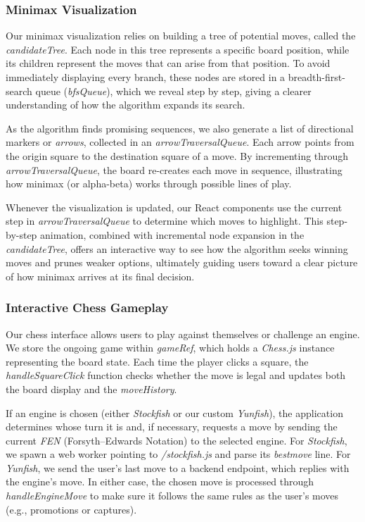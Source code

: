\documentclass[12pt,a4paper]{article}
\begin{document}
\subsubsection{Minimax Visualization}

Our minimax visualization relies on building a tree of potential moves, 
called the \emph{candidateTree}. Each node in this tree represents a 
specific board position, while its children represent the moves that 
can arise from that position. To avoid immediately displaying every 
branch, these nodes are stored in a breadth-first-search queue (\emph{bfsQueue}), 
which we reveal step by step, giving a clearer understanding of how the 
algorithm expands its search.

As the algorithm finds promising sequences, we also generate a list of 
directional markers or \emph{arrows}, collected in an \emph{arrowTraversalQueue}. 
Each arrow points from the origin square to the destination square of a 
move. By incrementing through \emph{arrowTraversalQueue}, the board 
re-creates each move in sequence, illustrating how minimax (or alpha-beta) 
works through possible lines of play. 

Whenever the visualization is updated, our React components use the 
current step in \emph{arrowTraversalQueue} to determine which moves to 
highlight. This step-by-step animation, combined with incremental node 
expansion in the \emph{candidateTree}, offers an interactive way to see 
how the algorithm seeks winning moves and prunes weaker options, 
ultimately guiding users toward a clear picture of how minimax arrives 
at its final decision.
\subsubsection{Interactive Chess Gameplay}

Our chess interface allows users to play against themselves or challenge 
an engine. We store the ongoing game within \emph{gameRef}, which holds a 
\emph{Chess.js} instance representing the board state. Each time the 
player clicks a square, the \emph{handleSquareClick} function checks 
whether the move is legal and updates both the board display and the 
\emph{moveHistory}. 

If an engine is chosen (either \emph{Stockfish} or our custom 
\emph{Yunfish}), the application determines whose turn it is and, if 
necessary, requests a move by sending the current \emph{FEN} (Forsyth–Edwards 
Notation) to the selected engine. For \emph{Stockfish}, we spawn a web 
worker pointing to \emph{/stockfish.js} and parse its \emph{bestmove} line. 
For \emph{Yunfish}, we send the user’s last move to a backend endpoint, 
which replies with the engine’s move. In either case, the chosen move is 
processed through \emph{handleEngineMove} to make sure it follows the 
same rules as the user’s moves (e.g., promotions or captures). 
\end{document}
